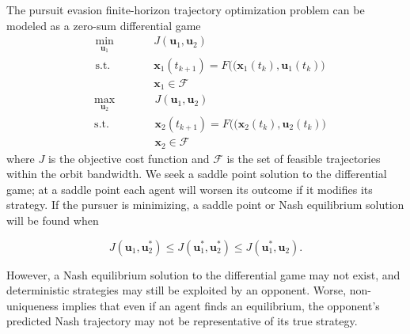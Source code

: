 The pursuit evasion finite-horizon trajectory optimization problem can be modeled as a zero-sum differential game
% 
\begin{subequations}
    \begin{alignat}{2}
    &\!\min_{ \boldsymbol{u}_1 } & \qquad & J( \boldsymbol{u}_1, \boldsymbol{u}_2 ) \label{eq:} \\
    &\text{s.t.}                 &        & \boldsymbol{x}_1( t_{k+1} ) = F\big( ( \boldsymbol{x}_1 (t_k), \boldsymbol{u}_1(t_k) \big) \label{eq:} \\
    &                            &        & \boldsymbol{x}_1 \in \mathcal{F} \label{eq:}
    \end{alignat}
\end{subequations}
% 
\begin{subequations}
    \begin{alignat}{2}
    &\!\max_{ \boldsymbol{u}_2 } & \qquad & J( \boldsymbol{u}_1, \boldsymbol{u}_2 ) \label{eq:} \\
    &\text{s.t.}                 &        & \boldsymbol{x}_2( t_{k+1} ) = F\big( ( \boldsymbol{x}_2 (t_k), \boldsymbol{u}_2(t_k) \big) \label{eq:} \\
    &                            &        & \boldsymbol{x}_2 \in \mathcal{F} \label{eq:}
    \end{alignat}
\end{subequations} 
% 
where $ J $ is the objective cost function and $ \mathcal{F} $ is the set of feasible trajectories within the orbit bandwidth. 
We seek a saddle point solution to the differential game; at a saddle point each agent will worsen its outcome if it modifies its strategy. If the pursuer is minimizing, a saddle point or Nash equilibrium solution will be found when 

\begin{equation}
    J( \boldsymbol{u}_1, \boldsymbol{u}_2^* ) \leq J( \boldsymbol{u}_1^*, \boldsymbol{u}_2^* ) \leq J( \boldsymbol{u}_1^*, \boldsymbol{u}_2 ). 
\end{equation}


However, a Nash equilibrium solution to the differential game may not exist, and deterministic strategies may still be exploited by an opponent. 
Worse, non-uniqueness implies that even if an agent finds an equilibrium, the opponent’s predicted Nash trajectory may not be representative of its true strategy.
 



